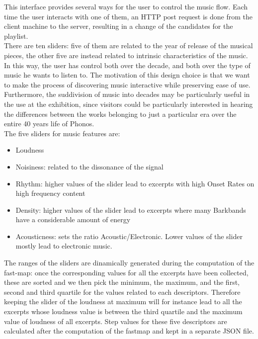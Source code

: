 This interface provides several ways for the user to control the music flow. Each time the user interacts with one of them, an HTTP post request is done from the client machine to the server, resulting in a change of the candidates for the playlist. \\
There are ten sliders: five of them are related to the year of release of the musical pieces, the other five are instead related to intrinsic characteristics of the music. In this way, the user has control both over the decade, and both over the type of music he wants to listen to. The motivation of this design choice is that we want to make the process of discovering music interactive while preserving ease of use. Furthermore, the suddivision of music into decades may be particularly useful in the use at the exhibition, since visitors could be particularly interested in hearing the differences between the works belonging to just a particular era over the entire 40 years life of Phonos. \\The five sliders for music features are:
\begin{itemize}
\item Loudness
\item Noisiness: related to the dissonance of the signal
\item Rhythm: higher values of the slider lead to excerpts with high Onset Rates on high frequency content
\item Density: higher values of the slider lead to excerpts where many Barkbands have a considerable amount of energy
\item Acousticness: sets the ratio Acoustic/Electronic. Lower values of the slider mostly lead to electronic music.
\end{itemize}
The ranges of the sliders are dinamically generated during the computation of the fast-map: once the corresponding values for all the excerpts have been collected, these are sorted and we then pick the minimum, the maximum, and the first, second and third quartile for the values related to each descriptors. Therefore keeping the slider of the loudness at maximum will for instance lead to all the excerpts whose loudness value is between the third quartile and the maximum value of loudness of all excerpts. Step values for these five descriptors are calculated after the computation of the fastmap and kept in a separate JSON file. \\
